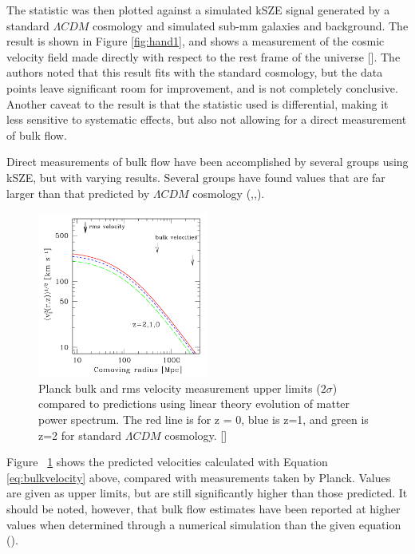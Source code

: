 \documentclass[manuscript]{aastex}
\begin{document}
The statistic was then plotted against a simulated kSZE signal generated by a standard $\Lambda CDM$  cosmology and simulated sub-mm galaxies and background. The result is shown in Figure \ref{fig:hand1}, and shows a measurement of the cosmic velocity field made directly with respect to the rest frame of the universe [\cite{Hand2012}]. The authors noted that this result fits with the standard cosmology, but the data points leave significant room for improvement, and is not completely conclusive. Another caveat to the result is that the statistic used is differential, making it less sensitive to systematic effects, but also not allowing for a direct measurement of bulk flow. 

Direct measurements of bulk flow have been accomplished by several groups using kSZE, but with varying results. Several groups have found values that are far larger than that predicted by \(\Lambda CDM\) cosmology (\cite{Kashlinsky2008},\cite{Watkins2009},\cite{Lavaux2010}). 
\begin{figure}
  \vspace{-0.8cm}
    \begin{center}
      \includegraphics[width=0.5\textwidth]{kitayama1.png}
    \end{center}
\caption[ Planck constraints on bulk flow -[\cite{Kitayama2014}]{Planck bulk and rms velocity measurement upper limits (\(2\sigma\)) compared to predictions using linear theory evolution of matter power spectrum. The red line is for z = 0, blue is z=1, and green is z=2 for standard \(\Lambda CDM\) cosmology.  [\cite{Kitayama2014}]}
\label{fig:bulkflow}
\end{figure}
Figure ~\ref{fig:bulkflow} shows the predicted velocities calculated with Equation \ref{eq:bulkvelocity} above, compared with measurements taken by Planck. Values are given as upper limits, but are still significantly higher than those predicted. It should be noted, however, that bulk flow estimates have been reported at higher values when determined through a numerical simulation than the given equation (\cite{Kitayama2014}).
\end{document}
